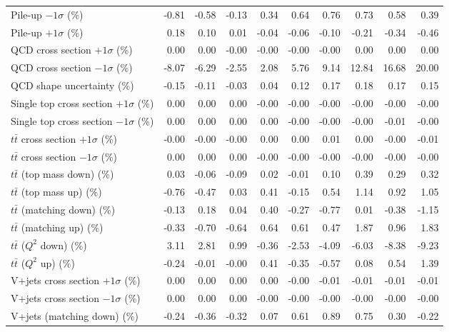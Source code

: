 \begin{table}[htbp]
{\begin{tabular}{lrrrrrrrrr}
Pile-up $-1\sigma$ (\%) & -0.81 & -0.58 & -0.13 & 0.34 & 0.64 & 0.76 & 0.73 & 0.58 & 0.39 \\ 
Pile-up $+1\sigma$ (\%) & 0.18 & 0.10 & 0.01 & -0.04 & -0.06 & -0.10 & -0.21 & -0.34 & -0.46 \\ 
QCD cross section \ensuremath{+1\sigma} (\%) & 0.00 & 0.00 & -0.00 & -0.00 & -0.00 & -0.00 & 0.00 & 0.00 & 0.00 \\ 
QCD cross section \ensuremath{-1\sigma} (\%) & -8.07 & -6.29 & -2.55 & 2.08 & 5.76 & 9.14 & 12.84 & 16.68 & 20.00 \\ 
QCD shape uncertainty (\%) & -0.15 & -0.11 & -0.03 & 0.04 & 0.12 & 0.17 & 0.18 & 0.17 & 0.15 \\ 
Single top cross section $+1\sigma$ (\%) & 0.00 & 0.00 & 0.00 & -0.00 & -0.00 & -0.00 & -0.00 & -0.00 & -0.00 \\ 
Single top cross section $-1\sigma$ (\%) & 0.00 & 0.00 & 0.00 & 0.00 & -0.00 & -0.00 & -0.00 & -0.01 & -0.00 \\ 
$t\bar{t}$ cross section $+1\sigma$ (\%) & -0.00 & -0.00 & -0.00 & 0.00 & 0.00 & 0.01 & 0.00 & -0.00 & -0.01 \\ 
$t\bar{t}$ cross section $-1\sigma$ (\%) & 0.00 & 0.00 & 0.00 & -0.00 & -0.00 & -0.00 & -0.00 & -0.00 & -0.00 \\ 
$t\bar{t}$ (top mass down) (\%) & 0.03 & -0.06 & -0.09 & 0.02 & -0.01 & 0.10 & 0.39 & 0.29 & 0.32 \\ 
$t\bar{t}$ (top mass up) (\%) & -0.76 & -0.47 & 0.03 & 0.41 & -0.15 & 0.54 & 1.14 & 0.92 & 1.05 \\ 
$t\bar{t}$ (matching down) (\%) & -0.13 & 0.18 & 0.04 & 0.40 & -0.27 & -0.77 & 0.01 & -0.38 & -1.15 \\ 
$t\bar{t}$ (matching up) (\%) & -0.33 & -0.70 & -0.64 & 0.64 & 0.61 & 0.47 & 1.87 & 0.96 & 1.83 \\ 
$t\bar{t}$ ($Q^{2}$ down) (\%) & 3.11 & 2.81 & 0.99 & -0.36 & -2.53 & -4.09 & -6.03 & -8.38 & -9.23 \\ 
$t\bar{t}$ ($Q^{2}$ up) (\%) & -0.24 & -0.01 & -0.00 & 0.41 & -0.35 & -0.57 & 0.08 & 0.54 & 1.39 \\ 
V+jets cross section \ensuremath{+1\sigma} (\%) & 0.00 & 0.00 & 0.00 & 0.00 & -0.00 & -0.01 & -0.01 & -0.01 & -0.01 \\ 
V+jets cross section \ensuremath{-1\sigma} (\%) & 0.00 & 0.00 & 0.00 & -0.00 & -0.00 & -0.00 & -0.00 & -0.00 & -0.00 \\ 
V+jets (matching down) (\%) & -0.24 & -0.36 & -0.32 & 0.07 & 0.61 & 0.89 & 0.75 & 0.30 & -0.22 \\ 

\end{tabular}}
\end{table}
